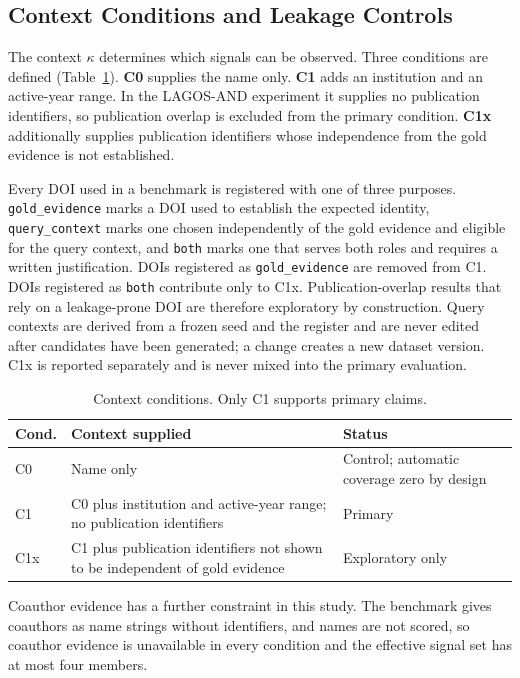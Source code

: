 \subsection{Context Conditions and Leakage Controls}
\label{sec:leakage}
The context $\kappa$ determines which signals can be observed. Three conditions are defined (Table~\ref{tab:conditions}). \textbf{C0} supplies the name only. \textbf{C1} adds an institution and an active-year range. In the LAGOS-AND experiment it supplies no publication identifiers, so publication overlap is excluded from the primary condition. \textbf{C1x} additionally supplies publication identifiers whose independence from the gold evidence is not established.

Every DOI used in a benchmark is registered with one of three purposes. \texttt{gold\_evidence} marks a DOI used to establish the expected identity, \texttt{query\_context} marks one chosen independently of the gold evidence and eligible for the query context, and \texttt{both} marks one that serves both roles and requires a written justification. DOIs registered as \texttt{gold\_evidence} are removed from C1. DOIs registered as \texttt{both} contribute only to C1x. Publication-overlap results that rely on a leakage-prone DOI are therefore exploratory by construction. Query contexts are derived from a frozen seed and the register and are never edited after candidates have been generated; a change creates a new dataset version. C1x is reported separately and is never mixed into the primary evaluation.

\begin{table}[t]
\caption{Context conditions. Only C1 supports primary claims.}
\label{tab:conditions}
\centering
\footnotesize
\renewcommand{\arraystretch}{1.1}
\begin{tabular}{@{}p{}p{}p{}@{}}
\toprule
\textbf{Cond.} & \textbf{Context supplied} & \textbf{Status} \\
\midrule
C0 & Name only & Control; automatic coverage zero by design \\
C1 & C0 plus institution and active-year range; no publication identifiers & Primary \\
C1x & C1 plus publication identifiers not shown to be independent of gold evidence & Exploratory only \\
\bottomrule
\end{tabular}
\end{table}

Coauthor evidence has a further constraint in this study. The benchmark gives coauthors as name strings without identifiers, and names are not scored, so coauthor evidence is unavailable in every condition and the effective signal set has at most four members.
